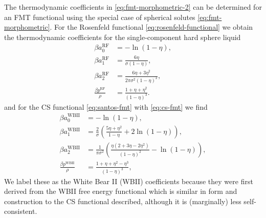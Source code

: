 The thermodynamic coefficients in \eqref{eq:fmt-morphometric-2} can be determined for an FMT functional using the special case of spherical solutes \eqref{eq:fmt-morphometric}.
For the Rosenfeld functional \eqref{eq:rosenfeld-functional} we obtain the thermodynamic coefficients for the single-component hard sphere liquid
\begin{subequations}\label{eq:rosenfeld-coefficients}
  \begin{align}
    \beta a_0^\mathrm{RF}
    &=
    -\ln{(1- \eta)},
    \\
    \beta a_1^\mathrm{RF}
    &=
    \frac{6\eta}{\sigma (1 - \eta)},
    \\
    \beta a_2^\mathrm{RF}
    &=
    \frac{6\eta + 3\eta^2}{2\pi \sigma^2 (1 - \eta)^2},
    \\
    \frac{\beta p^\mathrm{RF}}{\rho}
    &=
    \frac{1 + \eta + \eta^2}{(1 - \eta)^3}.
    \label{eq:py-pressure}
 \end{align}
\end{subequations}
and for the CS functional \eqref{eq:santos-fmt} with \eqref{eq:cs-fmt} we find
\begin{subequations}\label{eq:wbii-coefficients}
  \begin{align}
    \beta a_0^\mathrm{WBII}
    &=
    - \ln{(1 - \eta)},
    \\
    \beta a_1^\mathrm{WBII}
    &=
    \frac{2}{\sigma} \left(
    \frac{5\eta + \eta^2}{1 - \eta}
    + 2 \ln{(1 - \eta)}
    \right),
    \\
    \beta a_2^\mathrm{WBII}
    &=
    \frac{1}{\pi \sigma^2} \left(
    \frac{\eta (2 + 3\eta - 2\eta^2)}{(1 - \eta)^2}
    - \ln{(1 - \eta)}
    \right),
    \\
    \frac{\beta p^\mathrm{WBII}}{\rho}
    &=
    \frac{1 + \eta + \eta^2 - \eta^3}{(1-\eta)^3},
 \end{align}
\end{subequations}
We label these as the White Bear II (WBII) coefficients because they were first derived from the WBII free energy functional%
\cite{Hansen-GoosJCP2006, Hansen-GoosJPCM2006} which is similar in form and construction to the CS functional described, although it is (marginally) less self-consistent.

